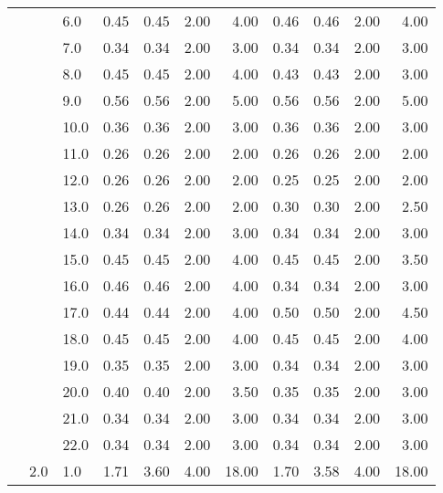 \begin{tabular}{lllrrrrrrrr}
       &     & 6.0  &       0.45 &      0.45 & 2.00 &   4.00 &       0.46 &      0.46 & 2.00 &   4.00 \\
       &     & 7.0  &       0.34 &      0.34 & 2.00 &   3.00 &       0.34 &      0.34 & 2.00 &   3.00 \\
       &     & 8.0  &       0.45 &      0.45 & 2.00 &   4.00 &       0.43 &      0.43 & 2.00 &   3.00 \\
       &     & 9.0  &       0.56 &      0.56 & 2.00 &   5.00 &       0.56 &      0.56 & 2.00 &   5.00 \\
       &     & 10.0 &       0.36 &      0.36 & 2.00 &   3.00 &       0.36 &      0.36 & 2.00 &   3.00 \\
       &     & 11.0 &       0.26 &      0.26 & 2.00 &   2.00 &       0.26 &      0.26 & 2.00 &   2.00 \\
       &     & 12.0 &       0.26 &      0.26 & 2.00 &   2.00 &       0.25 &      0.25 & 2.00 &   2.00 \\
       &     & 13.0 &       0.26 &      0.26 & 2.00 &   2.00 &       0.30 &      0.30 & 2.00 &   2.50 \\
       &     & 14.0 &       0.34 &      0.34 & 2.00 &   3.00 &       0.34 &      0.34 & 2.00 &   3.00 \\
       &     & 15.0 &       0.45 &      0.45 & 2.00 &   4.00 &       0.45 &      0.45 & 2.00 &   3.50 \\
       &     & 16.0 &       0.46 &      0.46 & 2.00 &   4.00 &       0.34 &      0.34 & 2.00 &   3.00 \\
       &     & 17.0 &       0.44 &      0.44 & 2.00 &   4.00 &       0.50 &      0.50 & 2.00 &   4.50 \\
       &     & 18.0 &       0.45 &      0.45 & 2.00 &   4.00 &       0.45 &      0.45 & 2.00 &   4.00 \\
       &     & 19.0 &       0.35 &      0.35 & 2.00 &   3.00 &       0.34 &      0.34 & 2.00 &   3.00 \\
       &     & 20.0 &       0.40 &      0.40 & 2.00 &   3.50 &       0.35 &      0.35 & 2.00 &   3.00 \\
       &     & 21.0 &       0.34 &      0.34 & 2.00 &   3.00 &       0.34 &      0.34 & 2.00 &   3.00 \\
       &     & 22.0 &       0.34 &      0.34 & 2.00 &   3.00 &       0.34 &      0.34 & 2.00 &   3.00 \\
       & 2.0 & 1.0  &       1.71 &      3.60 & 4.00 &  18.00 &       1.70 &      3.58 & 4.00 &  18.00 \\

\end{tabular}
